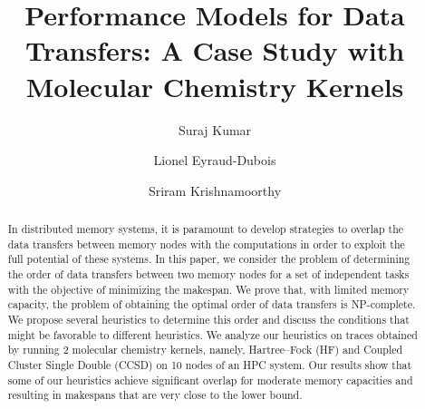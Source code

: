 \documentclass[sigconf]{acmart}
\begin{document}
	
	\title{Performance Models for Data Transfers: A Case Study with Molecular Chemistry Kernels}
	
	\author{Suraj Kumar}
	
	
	
	\author{Lionel Eyraud-Dubois}
	
	\author{Sriram Krishnamoorthy}
	
	\renewcommand{\shortauthors}{Kumar and Eyraud-Dubois, et al.}
	
	
	\begin{abstract}
		In distributed memory systems, it is paramount to develop strategies to overlap the data transfers between memory nodes with the computations in order to exploit the full potential of these systems. In this paper, we consider the problem of determining the order of data transfers between two memory nodes for a set of independent tasks with the objective of minimizing the makespan. We prove that, with limited memory capacity, the problem of obtaining the optimal order of data transfers is NP-complete. We propose several heuristics to determine this order and discuss the conditions that might be favorable to different heuristics. We analyze our heuristics on traces obtained by running 2 molecular chemistry kernels, namely, Hartree–Fock (HF) and Coupled Cluster Single Double (CCSD) on 10 nodes of an HPC system. Our results show that some of our heuristics achieve significant overlap for moderate memory capacities and resulting in makespans that are very close to the lower bound.
	\end{abstract}
	
\end{document}
